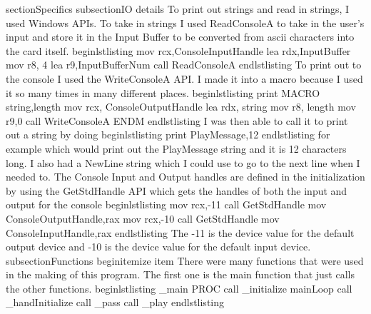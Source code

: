 section{Specifics}
subsection{IO details}
To print out strings and read in strings, I used Windows APIs. To take in strings I used ReadConsoleA to take in the user's input and store it in the Input Buffer to be converted from ascii characters into the card itself.
begin{lstlisting}
mov rcx,ConsoleInputHandle
lea rdx,InputBuffer
mov r8, 4
lea r9,InputBufferNum
call ReadConsoleA
end{lstlisting}
To print out to the console I used the WriteConsoleA API. I made it into a macro because I used it so many times in many different places.
begin{lstlisting}
print MACRO string,length
mov rcx, ConsoleOutputHandle
    lea rdx, string
    mov r8, length
    mov r9,0
    call WriteConsoleA
ENDM
end{lstlisting}
I was then able to call it to print out a string by doing
begin{lstlisting}
    print PlayMessage,12
end{lstlisting}
for example which would print out the PlayMessage string and it is 12 characters long.
I also had a NewLine string which I could use to go to the next line when I needed to.
The Console Input and Output handles are defined in the initialization by using the GetStdHandle API which gets the handles of both the input and output for the console
begin{lstlisting}
mov rcx,-11
call GetStdHandle
mov ConsoleOutputHandle,rax
mov rcx,-10
call GetStdHandle
mov ConsoleInputHandle,rax
end{lstlisting}
The -11 is the device value for the default output device and -10 is the device value for the default input device.
subsection{Functions}
begin{itemize}
    item There were many functions that were used in the making of this program. The first one is the main function that just calls the other functions.
    begin{lstlisting}
_main PROC
call _initialize
mainLoop
call _handInitialize
call _pass
call _play
    end{lstlisting}
    
